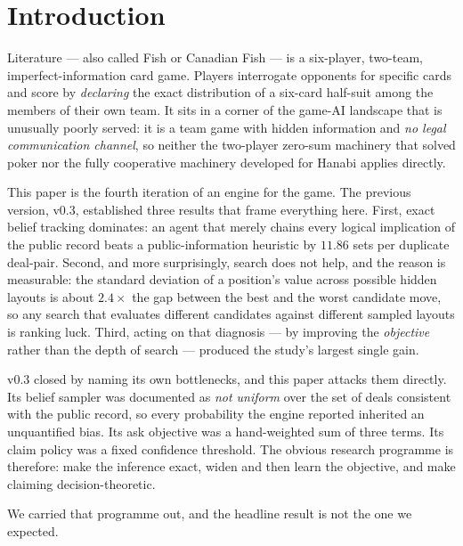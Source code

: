 \documentclass[11pt,a4paper]{article}
\begin{document}
\section{Introduction}
\label{sec:intro}

Literature --- also called Fish or Canadian Fish --- is a six-player,
two-team, imperfect-information card game. Players interrogate opponents for
specific cards and score by \emph{declaring} the exact distribution of a
six-card half-suit among the members of their own team. It sits in a corner of
the game-AI landscape that is unusually poorly served: it is a team game with
hidden information and \emph{no legal communication channel}, so neither the
two-player zero-sum machinery that solved poker nor the fully cooperative
machinery developed for Hanabi applies directly.

This paper is the fourth iteration of an engine for the game. The previous
version, v0.3, established three results that frame everything here. First,
exact belief tracking dominates: an agent that merely chains every logical
implication of the public record beats a public-information heuristic by
$11.86$ sets per duplicate deal-pair. Second, and more surprisingly, search
does not help, and the reason is measurable: the standard deviation of a
position's value across possible hidden layouts is about $2.4\times$ the gap
between the best and the worst candidate move, so any search that evaluates
different candidates against different sampled layouts is ranking luck. Third,
acting on that diagnosis --- by improving the \emph{objective} rather than the
depth of search --- produced the study's largest single gain.

v0.3 closed by naming its own bottlenecks, and this paper attacks them
directly. Its belief sampler was documented as \emph{not uniform} over the set
of deals consistent with the public record, so every probability the engine
reported inherited an unquantified bias. Its ask objective was a hand-weighted
sum of three terms. Its claim policy was a fixed confidence threshold. The
obvious research programme is therefore: make the inference exact, widen and
then learn the objective, and make claiming decision-theoretic.

We carried that programme out, and the headline result is not the one we
expected.
\end{document}
